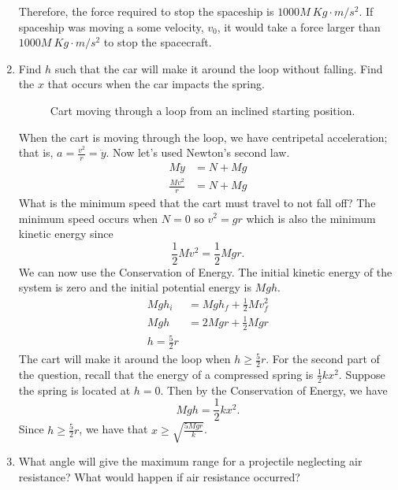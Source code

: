 \begin{enumerate}
  Therefore, the force required to stop the spaceship is
  \(1000M \ Kg\cdot m/s^2\).
  If spaceship was moving a some velocity, \(v_0\), it would take a force larger
  than \(1000M \ Kg\cdot m/s^2\) to stop the spacecraft.
\item
  Find \(h\) such that the car will make it around the loop without falling.
  Find the \(x\) that occurs when the car impacts the spring.
  \begin{figure}[H]
    \centering
    \quad
    \caption{Cart moving through a loop from an inclined starting position.}
  \end{figure}
  When the cart is moving through the loop, we have centripetal acceleration;
  that is, \(a = \frac{v^2}{r} = \ddot{y}\).
  Now let's used Newton's second law.
  \begin{align*}
    M\ddot{y} &= N + Mg\\
    \frac{Mv^2}{r} &= N + Mg
  \end{align*}
  What is the minimum speed that the cart must travel to not fall off?
  The minimum speed occurs when \(N = 0\) so \(v^2 = gr\) which is also the
  minimum kinetic energy since
  \[
  \frac{1}{2}Mv^2 = \frac{1}{2}Mgr.
  \]
  We can now use the Conservation of Energy.
  The initial kinetic energy of the system is zero and the initial potential
  energy is \(Mgh\).
  \begin{align*}
    Mgh_i &= Mgh_f + \frac{1}{2}Mv_f^2\\
    Mgh &= 2Mgr + \frac{1}{2}Mgr\\
    h = \frac{5}{2}r
  \end{align*}
  The cart will make it around the loop when \(h\geq\frac{5}{2}r\).
  For the second part of the question, recall that the energy of a compressed
  spring is \(\frac{1}{2}kx^2\).
  Suppose the spring is located at \(h = 0\).
  Then by the Conservation of Energy, we have
  \[
  Mgh = \frac{1}{2}kx^2.
  \]
  Since \(h\geq\frac{5}{2}r\), we have that \(x\geq\sqrt{\frac{5Mgr}{k}}\).
\item
  What angle will give the maximum range for a projectile neglecting air
  resistance?
  What would happen if air resistance occurred?
  \begin{figure}[H]
    \centering
\end{figure}
\end{enumerate}
